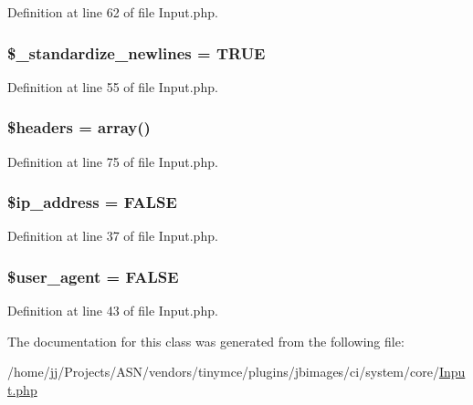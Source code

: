 Definition at line 62 of file Input.\+php.

\subsubsection[{\texorpdfstring{\$\+\_\+standardize\+\_\+newlines}{$_standardize_newlines}}]{\setlength{\rightskip}{0pt plus 5cm}\$\+\_\+standardize\+\_\+newlines = T\+R\+UE}\hypertarget{class_c_i___input_ad9ebdfce8f992b3a41aaf64ea8782933}{}\label{class_c_i___input_ad9ebdfce8f992b3a41aaf64ea8782933}


Definition at line 55 of file Input.\+php.

\subsubsection[{\texorpdfstring{\$headers}{$headers}}]{\setlength{\rightskip}{0pt plus 5cm}\$headers = array()\hspace{0.3cm}{\ttfamily [protected]}}\hypertarget{class_c_i___input_a52500036ee807241b8b4b7e2367c49ef}{}\label{class_c_i___input_a52500036ee807241b8b4b7e2367c49ef}


Definition at line 75 of file Input.\+php.

\subsubsection[{\texorpdfstring{\$ip\+\_\+address}{$ip_address}}]{\setlength{\rightskip}{0pt plus 5cm}\${\bf ip\+\_\+address} = F\+A\+L\+SE}\hypertarget{class_c_i___input_a614e10d1ab6dcf06fa7fef37af7b7eee}{}\label{class_c_i___input_a614e10d1ab6dcf06fa7fef37af7b7eee}


Definition at line 37 of file Input.\+php.

\subsubsection[{\texorpdfstring{\$user\+\_\+agent}{$user_agent}}]{\setlength{\rightskip}{0pt plus 5cm}\${\bf user\+\_\+agent} = F\+A\+L\+SE}\hypertarget{class_c_i___input_aeea73d2dc27fea041fbcadae59f07cd5}{}\label{class_c_i___input_aeea73d2dc27fea041fbcadae59f07cd5}


Definition at line 43 of file Input.\+php.



The documentation for this class was generated from the following file\+:\begin{DoxyCompactItemize}
\item 
/home/jj/\+Projects/\+A\+S\+N/vendors/tinymce/plugins/jbimages/ci/system/core/\hyperlink{_input_8php}{Input.\+php}\end{DoxyCompactItemize}

